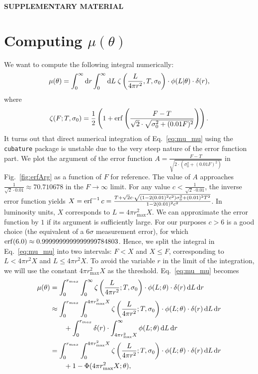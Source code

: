\bigskip \begin{center} {\large\bf SUPPLEMENTARY MATERIAL} \end{center}

\section{Computing $\mu(\theta)$}
\label{sec:comp_mu_theta}


We want to compute the following integral numerically:
\begin{equation}
\mu(\theta) = \int_{0}^{\infty} \textrm{d} r \int_{0}^{\infty} \textrm{d} L \; \zeta\left(\frac{L}{4\pi r^2},T,\sigma_{0}\right)\cdot\phi(L|\theta)\cdot \delta(r),
\label{eq:mu_mu}
\end{equation}
where
\begin{equation}
\zeta(F ; T,\sigma_{0}) =
	\frac{1}{2}\left( 1 + \operatorname{erf}\left( \frac{F - T}{\sqrt{2} \cdot \sqrt{\sigma_{0}^2+(0.01 F)^2}} \right) \right).
	\label{eq:mu_zeta}
\end{equation}
It turns out that direct numerical integration of Eq.~\ref{eq:mu_mu} using the \texttt{cubature} package \citep{johnsoncubature} is unstable due to the very steep nature of the error function part.
We plot the argument of the error function $A = \frac{F - T}{\sqrt{2\cdot(\sigma_{0}^2 + (0.01 F)^2)}}$ in Fig.~\ref{fig:erfArg} as a function of $F$ for reference.
The value of $A$ approaches $\frac{1}{\sqrt{2}\cdot 0.01} \approx 70.710678 $ in the $F \rightarrow \infty$ limit.
For any value $c < \frac{1}{\sqrt{2}\cdot 0.01}$, the inverse error function yields $X = \operatorname{erf}^{-1}{c} = \frac{T+\sqrt{2}c\cdot \sqrt{(1-2(0.01)^2 c^2)\sigma_{0}^2 + (0.01)^2 T^2}}{1-2(0.01)^2 c^2}$.
In luminosity units, $X$ corresponds to $L = 4\pi r^2_\textrm{max}X$.
We can approximate the error function by $1$ if its argument is sufficiently large.
For our purposes $c > 6$ is a good choice (the equivalent of a $6\sigma$ measurement error), for which $\operatorname{erf}(6.0) \approx 0.9999999999999999784803$.
Hence, we split the integral in Eq.~\ref{eq:mu_mu} into two intervals: $F < X$ and $X \leq F$, corresponding to $L < 4\pi r^2 X$ and $L \leq 4\pi r^2 X$.
To avoid the variable $r$ in the limit of the integration, we will use the constant $ 4\pi r^2_\textrm{max} X$ as the threshold.
Eq.~\ref{eq:mu_mu} becomes 
\begin{align}
\label{eq:mu_approx}
\mu(\theta)
  &=\int_{0}^{r_{max}} \int_{0}^{\infty} \zeta\left(\frac{L}{4\pi r^2} ; T,\sigma_{0}\right)\cdot\phi(L ; \theta)\cdot \delta(r)\, \textrm{d} L \, \textrm{d} r\\
  &\approx \int_{0}^{r_{max}} \int_{0}^{4\pi r_{\max}^2 X} \zeta\left(\frac{L}{4\pi r^2} ; T,\sigma_{0}\right)\cdot\phi(L ; \theta)\cdot \delta(r)\, \textrm{d} L \, \textrm{d} r\\
  &\qquad + \int_{0}^{r_{max}} \delta(r)\cdot\int_{4\pi r_{\max}^2 X}^{\infty} \phi(L ; \theta)\, \textrm{d} L \, \textrm{d} r\\
  &= \int_{0}^{r_{max}} \int_{0}^{4\pi r_{\max}^2 X} \zeta\left(\frac{L}{4\pi r^2} ; T,\sigma_{0}\right)\cdot\phi(L ; \theta)\cdot \delta(r)\, \textrm{d} L \, \textrm{d} r\\
  &\qquad + 1 - \Phi(4\pi r_{\max}^2 X ; \theta),
\end{align}

